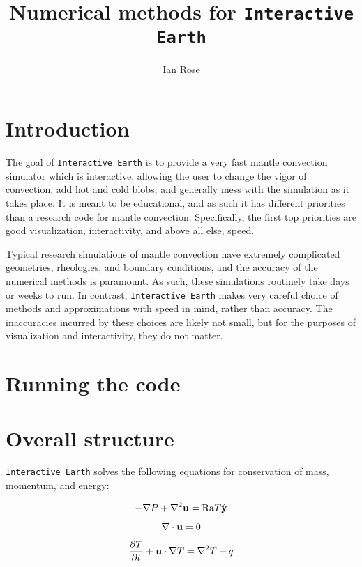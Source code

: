 \documentclass[a4paper,10pt]{article}
\title{Numerical methods for \texttt{Interactive Earth}}
\author{Ian Rose}
\date{}
\begin{document}
\maketitle

\section{Introduction}

The goal of \texttt{Interactive Earth} is to provide a very fast mantle convection simulator which is interactive, allowing the user to change the vigor of convection, add hot and cold blobs, and generally mess with the simulation as it takes place. 
It is meant to be educational, and as such it has different priorities than a research code for mantle convection. 
Specifically, the first top priorities are good visualization, interactivity, and above all else, speed.


Typical research simulations of mantle convection have extremely complicated geometries, rheologies, and boundary conditions, and the accuracy of the numerical methods is paramount.
As such, these simulations routinely take days or weeks to run.
In contrast, \texttt{Interactive Earth} makes very careful choice of methods and approximations with speed in mind, rather than accuracy.
The inaccuracies incurred by these choices are likely not small, but for the purposes of visualization and interactivity, they do not matter.

\section{Running the code}

\section{Overall structure}

\texttt{Interactive Earth} solves the following equations for conservation of mass, momentum, and energy:

\begin{equation}
-\nabla{P} + \nabla^2 {\bf u}  = \mathrm{Ra} T \hat{\bf y}
\end{equation}

\begin{equation}
\nabla \cdot {\bf u} = 0
\end{equation}

\begin{equation}
\frac{\partial T}{\partial t} + {\bf u} \cdot \nabla T = \nabla^2 T + q
\end{equation}
\end{document}
